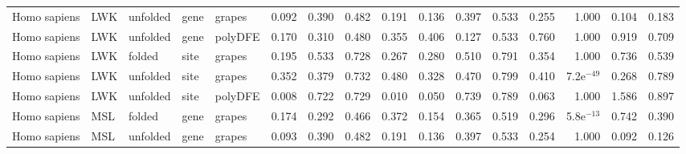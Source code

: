 \begin{longtable}{lllllrrrrrrrrrrr}
        Homo sapiens &                       LWK &  unfolded &  gene &   grapes &                              0.092 &                               0.390 &                 0.482 &                 0.191 &                              0.136 &                               0.397 &                 0.533 &                 0.255 &         1.000 &  0.104 &  0.183 \\
        Homo sapiens &                       LWK &  unfolded &  gene &  polyDFE &                              0.170 &                               0.310 &                 0.480 &                 0.355 &                              0.406 &                               0.127 &                 0.533 &                 0.760 &         1.000 &  0.919 &  0.709 \\
        Homo sapiens &                       LWK &    folded &  site &   grapes &                              0.195 &                               0.533 &                 0.728 &                 0.267 &                              0.280 &                               0.510 &                 0.791 &                 0.354 &         1.000 &  0.736 &  0.539 \\
        Homo sapiens &                       LWK &  unfolded &  site &   grapes &                              0.352 &                               0.379 &                 0.732 &                 0.480 &                              0.328 &                               0.470 &                 0.799 &                 0.410 &  7.2e$^{-49}$ &  0.268 &  0.789 \\
        Homo sapiens &                       LWK &  unfolded &  site &  polyDFE &                              0.008 &                               0.722 &                 0.729 &                 0.010 &                              0.050 &                               0.739 &                 0.789 &                 0.063 &         1.000 &  1.586 &  0.897 \\
        Homo sapiens &                       MSL &    folded &  gene &   grapes &                              0.174 &                               0.292 &                 0.466 &                 0.372 &                              0.154 &                               0.365 &                 0.519 &                 0.296 &  5.8e$^{-13}$ &  0.742 &  0.390 \\
        Homo sapiens &                       MSL &  unfolded &  gene &   grapes &                              0.093 &                               0.390 &                 0.482 &                 0.191 &                              0.136 &                               0.397 &                 0.533 &                 0.254 &         1.000 &  0.092 &  0.126 \\

\end{longtable}
